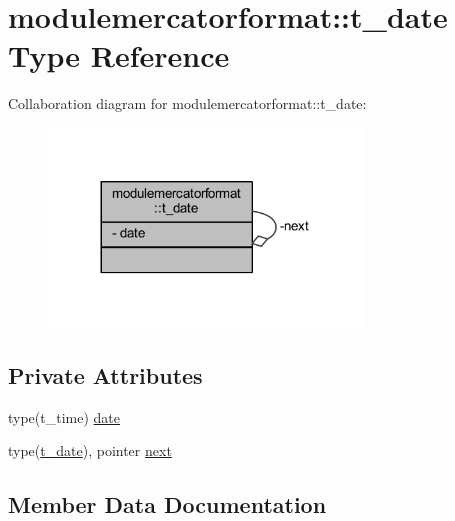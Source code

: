 \hypertarget{structmodulemercatorformat_1_1t__date}{}\section{modulemercatorformat\+:\+:t\+\_\+date Type Reference}
\label{structmodulemercatorformat_1_1t__date}


Collaboration diagram for modulemercatorformat\+:\+:t\+\_\+date\+:\nopagebreak
\begin{figure}[H]
\begin{center}
\leavevmode
\includegraphics[width=236pt]{structmodulemercatorformat_1_1t__date__coll__graph}
\end{center}
\end{figure}
\subsection*{Private Attributes}
\begin{DoxyCompactItemize}
\item 
type(t\+\_\+time) \mbox{\hyperlink{structmodulemercatorformat_1_1t__date_a95bfbc3dd60c6ff15f8e701e254319a9}{date}}
\item 
type(\mbox{\hyperlink{structmodulemercatorformat_1_1t__date}{t\+\_\+date}}), pointer \mbox{\hyperlink{structmodulemercatorformat_1_1t__date_a7d3fccdececebe11110578ccef68f957}{next}}
\end{DoxyCompactItemize}


\subsection{Member Data Documentation}
\mbox{\label{structmodulemercatorformat_1_1t__date_a95bfbc3dd60c6ff15f8e701e254319a9}} 
